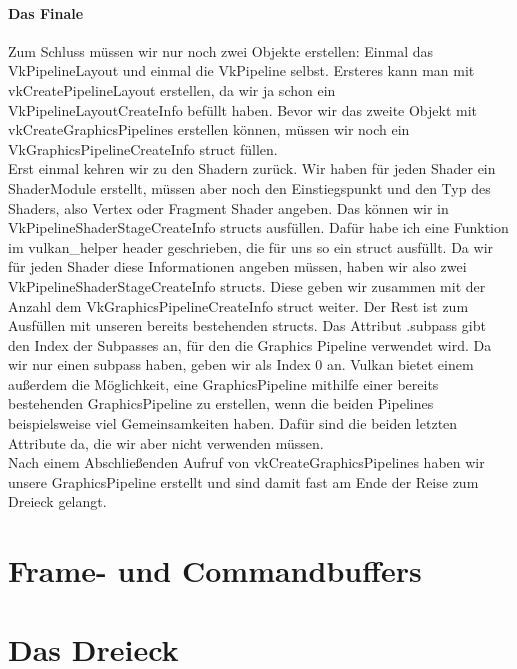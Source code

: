 \documentclass[11pt,a4paper]{report}
\begin{document}
\subsubsection{Das Finale}
Zum Schluss müssen wir nur noch zwei Objekte erstellen: Einmal das VkPipelineLayout und einmal die VkPipeline selbst. Ersteres kann man mit vkCreatePipelineLayout erstellen, da wir ja schon ein VkPipelineLayoutCreateInfo befüllt haben. Bevor wir das zweite Objekt mit vkCreateGraphicsPipelines erstellen können, müssen wir noch ein VkGraphicsPipelineCreateInfo struct füllen.\\
Erst einmal kehren wir zu den Shadern zurück. Wir haben für jeden Shader ein ShaderModule erstellt, müssen aber noch den Einstiegspunkt und den Typ des Shaders, also Vertex oder Fragment Shader angeben. Das können wir in VkPipelineShaderStageCreateInfo structs ausfüllen. Dafür habe ich eine Funktion im vulkan\_helper header geschrieben, die für uns so ein struct ausfüllt. Da wir für jeden Shader diese Informationen angeben müssen, haben wir also zwei VkPipelineShaderStageCreateInfo structs. Diese geben wir zusammen mit der Anzahl dem VkGraphicsPipelineCreateInfo struct weiter. Der Rest ist zum Ausfüllen mit unseren bereits bestehenden structs. Das Attribut .subpass gibt den Index der Subpasses an, für den die Graphics Pipeline verwendet wird. Da wir nur einen subpass haben, geben wir als Index 0 an. Vulkan bietet einem außerdem die Möglichkeit, eine GraphicsPipeline mithilfe einer bereits bestehenden GraphicsPipeline zu erstellen, wenn die beiden Pipelines beispielsweise viel Gemeinsamkeiten haben. Dafür sind die beiden letzten Attribute da, die wir aber nicht verwenden müssen.\\
Nach einem Abschließenden Aufruf von vkCreateGraphicsPipelines haben wir unsere GraphicsPipeline erstellt und sind damit fast am Ende der Reise zum Dreieck gelangt.


\chapter{Frame- und Commandbuffers}
\chapter{Das Dreieck}
\end{document}
